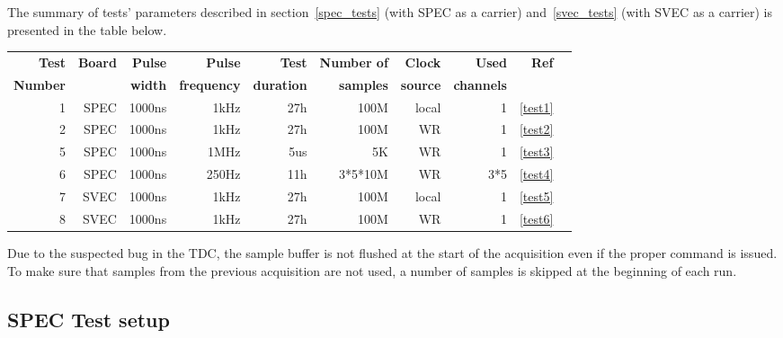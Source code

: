 \documentclass[a4paper, 12pt]{article}
\begin{document}
The summary of tests' parameters described in section~\ref{spec_tests}
(with SPEC as a carrier) and~\ref{svec_tests} (with SVEC as a carrier)
is presented in the table below.
\begin{center}
\footnotesize
  \begin{tabular}{|r|r|r|r|r|r|r|r|r|r|}
    \hline
    {\bf Test}   & {\bf Board} & {\bf Pulse} & {\bf Pulse}     & {\bf Test}     & {\bf Number of} & {\bf Clock}  & {\bf Used}     & {\bf Ref}    \\
    {\bf Number} & {\bf }      & {\bf width} & {\bf frequency} & {\bf duration} & {\bf samples}   & {\bf source} & {\bf channels} & {\bf }       \\
    \hline
    1            & SPEC        & 1000ns      & 1kHz            & 27h            & 100M            & local        & 1              & \ref{test1}  \\
    2            & SPEC        & 1000ns      & 1kHz            & 27h            & 100M            & WR           & 1              & \ref{test2}  \\
    5            & SPEC        & 1000ns      & 1MHz            & 5us            & 5K              & WR           & 1              & \ref{test3}  \\
    6            & SPEC        & 1000ns      & 250Hz           & 11h            & 3*5*10M         & WR           & 3*5            & \ref{test4}  \\
\hline
    7            & SVEC        & 1000ns      & 1kHz            & 27h            & 100M            & local        & 1              & \ref{test5}  \\
    8            & SVEC        & 1000ns      & 1kHz            & 27h            & 100M            & WR           & 1              & \ref{test6}  \\
    \hline
  \end{tabular}
\end{center}

Due to the suspected bug in the TDC, the sample buffer is not flushed at the start
of the acquisition even if the proper command is issued. To make sure that
samples from the previous acquisition are not used, a number of samples
is skipped at the beginning of each run.

\FloatBarrier

\subsection{SPEC Test setup}
\label{spec_test_setup}
\end{document}
